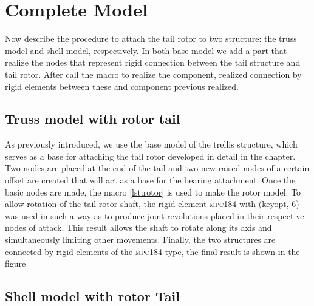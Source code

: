 \chapter{Complete Model}
Now describe the procedure to attach the tail rotor to two structure: the truss model and shell model, respectively.
In both base model we add a part that realize the nodes that represent rigid connection between the tail structure and tail rotor.
After call the macro to realize the component, realized connection by rigid elements between these and component previous realized.

\section{Truss model with rotor tail}
As previously introduced, we use the base model of the trellis structure, which serves as a base for attaching the tail rotor developed in detail in the chapter.
Two nodes are placed at the end of the tail and two new raised nodes of a certain offset are created that will act as a base for the bearing attachment.
Once the basic nodes are made, the macro \ref{lst:rotor} is used to make the rotor model.
To allow rotation of the tail rotor shaft, the rigid element \textsc{mpc184} with (keyopt, 6) was used in such a way as to produce joint revolutions placed in their respective nodes of attack.
This result allows the shaft to rotate along its axis and simultaneously limiting other movements.
Finally, the two structures are connected by rigid elements of the \textsc{mpc184} type, the final result is shown in the figure




\section{Shell model with rotor Tail}

